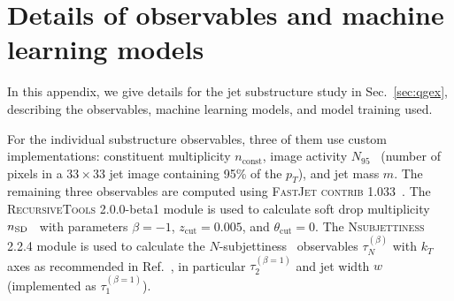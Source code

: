 \documentclass[letterpaper,11pt]{article}
\DeclareRobustCommand{\Sec}[1]{Sec.~\ref{#1}}
\DeclareRobustCommand{\Ref}[1]{Ref.~\cite{#1}}
\begin{document}
\section{Details of observables and machine learning models}
\label{sec:train}

In this appendix, we give details for the jet substructure study in \Sec{sec:qgex}, describing the observables, machine learning models, and model training used.


For the individual substructure observables, three of them use custom implementations: constituent multiplicity $n_\text{const}$, image activity $N_{95}$~\cite{Pumplin:1991kc} (number of pixels in a $33\times33$ jet image containing 95\% of the $p_T$), and jet mass $m$.
%
The remaining three observables are computed using \textsc{FastJet contrib} 1.033~\cite{fjcontrib}.
%
The \textsc{RecursiveTools} 2.0.0-beta1 module is used to calculate soft drop multiplicity $n_{\rm SD}$~\cite{Frye:2017yrw} with parameters $\beta=-1$, $z_\text{cut}=0.005$, and $\theta_\text{cut}=0$.
%
The \textsc{Nsubjettiness} 2.2.4 module is used to calculate the $N$-subjettiness~\cite{Thaler:2010tr,Thaler:2011gf} observables $\tau_N^{(\beta)}$ with $k_T$ axes as recommended in \Ref{Datta:2017rhs}, in particular $\tau_2^{(\beta=1)}$ and jet width $w$ (implemented as $\tau_1^{(\beta=1)}$).
\end{document}
